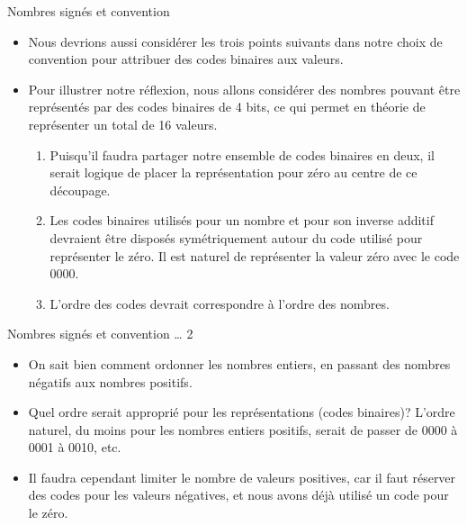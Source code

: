 \documentclass[presentation]{beamer}
\begin{document}
\begin{frame}[label={sec:orgc6d60ba}]{Nombres signés et convention}
\begin{itemize}
\item Nous devrions aussi considérer les trois points suivants dans notre choix de convention pour attribuer des codes binaires aux valeurs.

\item Pour illustrer notre réflexion, nous allons considérer des nombres pouvant être représentés par des codes binaires de 4 bits, ce qui permet en théorie de représenter un total de 16 valeurs.

\begin{enumerate}
\item Puisqu'il faudra partager notre ensemble de codes binaires en deux, il serait logique de placer la représentation pour zéro au centre de ce découpage.

\item Les codes binaires utilisés pour un nombre et pour son inverse additif devraient être disposés symétriquement autour du code utilisé pour représenter le zéro. Il est naturel de représenter la valeur zéro avec le code 0000.

\item L'ordre des codes devrait correspondre à l'ordre des nombres.
\end{enumerate}
\end{itemize}
\end{frame}

\begin{frame}[label={sec:orgcf70c75}]{Nombres signés et convention \ldots{} 2}
\begin{itemize}
\item On sait bien comment ordonner les nombres entiers, en passant des nombres négatifs aux nombres positifs.

\item Quel ordre serait approprié pour les représentations (codes binaires)?  L'ordre naturel, du moins pour les nombres entiers positifs, serait de passer de 0000 à 0001 à 0010, etc.

\item Il faudra cependant limiter le nombre de valeurs positives, car il faut réserver des codes pour les valeurs négatives, et nous avons déjà utilisé un code pour le zéro.
\end{itemize}
\end{frame}
\end{document}
